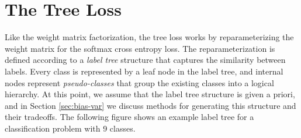 \documentclass[twoside]{article}
\theoremstyle{definition}
\newtheorem{theorem}{Theorem}
\DeclareMathOperator{\E}{\mathbb E}
\DeclareMathOperator*{\argmin}{arg\,min}
\newcommand{\vv}{\mathbf v}
\newcommand{\uu}{\mathbf u}
\newcommand{\ltwo}[1]{{\lVert {#1} \rVert}_2}
\newcommand{\fixme}[1]{\noindent{\color{red}\textbf{FIXME:}  {#1}}}
\begin{document}


\section{The Tree Loss}

Like the weight matrix factorization, the tree loss works by reparameterizing the weight matrix for the softmax cross entropy loss.
The reparameterization is defined according to a \emph{label tree} structure that captures the similarity between labels.
Every class is represented by a leaf node in the label tree,
and internal nodes represent \emph{pseudo-classes} that group the existing classes into a logical hierarchy.
At this point, we assume that the label tree structure is given a priori, and in Section \ref{sec:bias-var} we discuss methods for generating this structure and their tradeoffs.
The following figure shows an example label tree for a classification problem with 9 classes.
\end{document}
